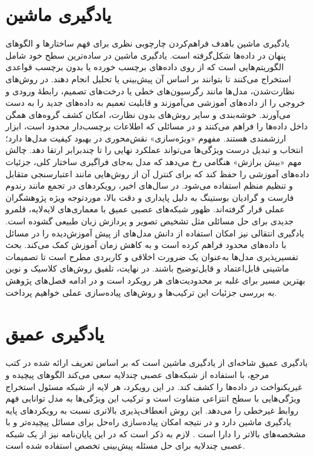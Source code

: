 \section{یادگیری ماشین}
یادگیری ماشین باهدف فراهم‌کردن چارچوبی نظری برای فهم ساختارها و الگوهای پنهان در داده‌ها شکل‌گرفته است. یادگیری ماشین در ساده‌ترین سطح خود شامل الگوریتم‌هایی است که از روی داده‌های برچسب خورده یا بدون برچسب قواعدی استخراج می‌کنند تا بتوانند بر اساس آن پیش‌بینی یا تحلیل انجام دهند. در روش‌های نظارت‌شدن، مدل‌ها مانند رگرسیون‌های خطی یا درخت‌های تصمیم، رابطهٔ ورودی و خروجی را از داده‌های آموزشی می‌آموزند و قابلیت تعمیم به داده‌های جدید را به دست می‌آورند. خوشه‌بندی و سایر روش‌های بدون نظارت، امکان کشف گروه‌های همگن داخل داده‌ها را فراهم می‌کنند و در مسائلی که اطلاعات برچسب‌دار محدود است، ابزار ارزشمندی هستند. مفهوم «ویژه‌سازی» نقش‌محوری در بهبود کیفیت مدل‌ها دارد؛ انتخاب و تبدیل درست ویژگی‌ها می‌تواند عملکرد نهایی را تا چندبرابر ارتقا دهد. چالش مهم «بیش برازش» هنگامی رخ می‌دهد که مدل به‌جای فراگیری ساختار کلی، جزئیات داده‌های آموزشی را حفظ کند که برای کنترل آن از روش‌هایی مانند اعتبارسنجی متقابل و تنظیم منظم استفاده می‌شود. در سال‌های اخیر، رویکردهای در تجمع مانند رندوم فارست و گرادیان بوستینگ به دلیل پایداری و دقت بالا، موردتوجه ویژه پژوهشگران عملی قرار گرفته‌اند. ظهور شبکه‌های عصبی عمیق با معماری‌های لایه‌لایه، قلمرو جدیدی برای حل مسائلی مثل تشخیص تصویر و پردازش زبان طبیعی گشوده است. یادگیری انتقالی نیز امکان استفاده از دانش مدل‌های از پیش آموزش‌دیده را در مسائل با داده‌های محدود فراهم کرده است و به کاهش زمان آموزش کمک می‌کند. بحث تفسیرپذیری مدل‌ها به‌عنوان یک ضرورت اخلاقی و کاربردی مطرح است تا تصمیمات ماشینی قابل‌اعتماد و قابل‌توضیح باشند. در نهایت، تلفیق روش‌های کلاسیک و نوین بهترین مسیر برای غلبه بر محدودیت‌های هر رویکرد است و در ادامه فصل‌های پژوهش به بررسی جزئیات این ترکیب‌ها و روش‌های پیاده‌سازی عملی خواهیم پرداخت.


\section{یادگیری عمیق}
یادگیری عمیق شاخه‌ای از یادگیری ماشین است که بر اساس تعریف ارائه شده در کتب مرجع، با استفاده از شبکه‌های عصبی چندلایه سعی می‌کند الگوهای پیچیده و غیریکنواخت در داده‌ها را کشف کند. در این رویکرد، هر لایه از شبکه مسئول استخراج ویژگی‌هایی با سطح انتزاعی متفاوت است و ترکیب این ویژگی‌ها به مدل توانایی فهم روابط غیرخطی را می‌دهد. این روش انعطاف‌پذیری بالاتری نسبت به رویکردهای پایه یادگیری ماشین دارد و در نتیجه امکان پیاده‌سازی راه‌حل برای مسائل پیچیده‌تر و با مشخصه‌های بالاتر را دارا است \cite{bishop_pattern_2006} \cite{goodfellow_deep_2016} \cite{nielsen_neural_2015}. لازم به ذکر است که در این پایان‌نامه نیز از یک شبکه عصبی چندلایه برای حل مسئله پیش‌بینی تخصص استفاده شده است.



